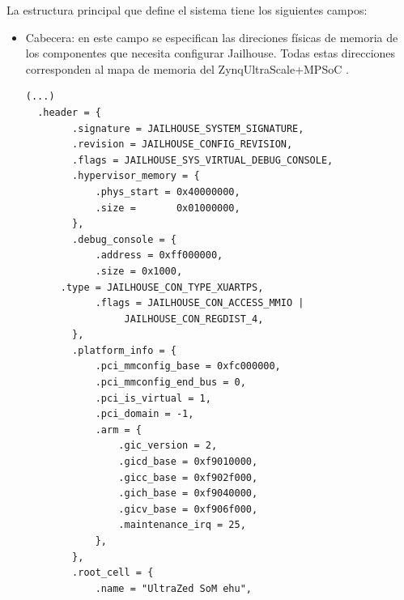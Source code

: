La estructura principal que define el sistema tiene los siguientes campos:
\begin{itemize}
  \item Cabecera: en este campo se especifican las direciones físicas de memoria de los componentes que necesita configurar Jailhouse. Todas estas direcciones corresponden al mapa de memoria del Zynq\textregistered UltraScale+\texttrademark MPSoC \cite{mpsoc_registers}.\\
  \begin{lstlisting}[style=CStyle]
  (...)
  .header = {
		.signature = JAILHOUSE_SYSTEM_SIGNATURE,
		.revision = JAILHOUSE_CONFIG_REVISION,
		.flags = JAILHOUSE_SYS_VIRTUAL_DEBUG_CONSOLE,
		.hypervisor_memory = {
			.phys_start = 0x40000000,
			.size =       0x01000000,
		},
		.debug_console = {
			.address = 0xff000000,
			.size = 0x1000,
      .type = JAILHOUSE_CON_TYPE_XUARTPS,
			.flags = JAILHOUSE_CON_ACCESS_MMIO |
				 JAILHOUSE_CON_REGDIST_4,
		},
		.platform_info = {
			.pci_mmconfig_base = 0xfc000000,
			.pci_mmconfig_end_bus = 0,
			.pci_is_virtual = 1,
			.pci_domain = -1,
			.arm = {
				.gic_version = 2,
				.gicd_base = 0xf9010000,
				.gicc_base = 0xf902f000,
				.gich_base = 0xf9040000,
				.gicv_base = 0xf906f000,
				.maintenance_irq = 25,
			},
		},
		.root_cell = {
			.name = "UltraZed SoM ehu",


\end{lstlisting}
\end{itemize}
